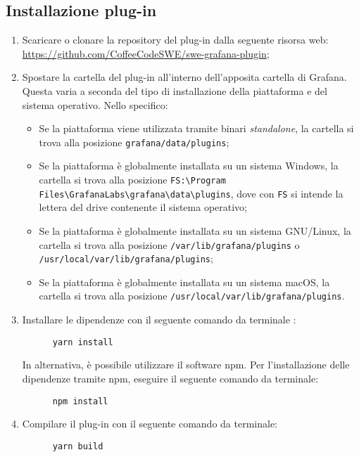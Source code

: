 \documentclass[../manuale-sviluppatore.tex]{subfiles}
\begin{document}
\subsection{Installazione plug-in}
\label{subs:installazione_plug_in}
\begin{enumerate}
    \item Scaricare o clonare la repository del plug-in dalla seguente risorsa web: \href{https://github.com/CoffeeCodeSWE/swe-grafana-plugin}{https://github.com/CoffeeCodeSWE/swe-grafana-plugin};
    \item Spostare la cartella del plug-in all'interno dell'apposita cartella di Grafana. Questa varia a seconda del tipo di installazione della piattaforma e del sistema operativo. Nello specifico:
    \begin{itemize}
      \item Se la piattaforma viene utilizzata tramite binari \textit{standalone}, la cartella si trova alla posizione \texttt{grafana/data/plugins};
      \item Se la piattaforma è globalmente installata su un sistema Windows, la cartella si trova alla posizione \texttt{FS:\textbackslash Program Files\textbackslash GrafanaLabs\textbackslash grafana\textbackslash data\textbackslash plugins}, dove con \texttt{FS} si intende la lettera del drive contenente il sistema operativo;
      \item Se la piattaforma è globalmente installata su un sistema GNU/Linux, la cartella si trova alla posizione \texttt{/var/lib/grafana/plugins} o \texttt{/usr/local/var/lib/grafana/plugins};
      \item Se la piattaforma è globalmente installata su un sistema macOS, la cartella si trova alla posizione \texttt{/usr/local/var/lib/grafana/plugins}.
    \end{itemize}
    \item Installare le dipendenze con il seguente comando da terminale :
    \begin{verbatim}
      yarn install
    \end{verbatim}
    In alternativa, è possibile utilizzare il software npm. Per l'installazione delle dipendenze tramite npm, eseguire il seguente comando da terminale:
    \begin{verbatim}
      npm install
    \end{verbatim}
    \item Compilare il plug-in con il seguente comando da terminale:
    \begin{verbatim}
      yarn build

\end{verbatim}
\end{enumerate}
\end{document}

